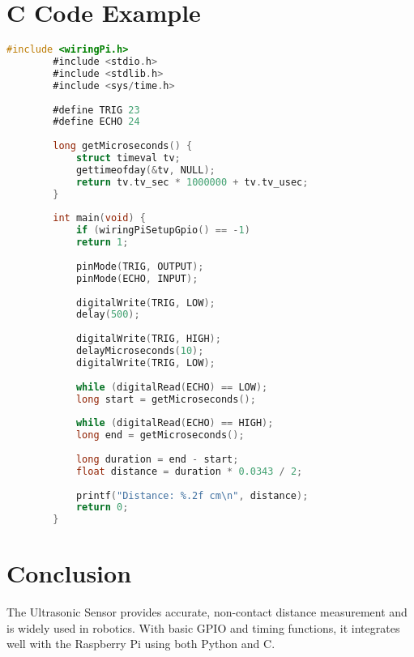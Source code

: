 \documentclass{article}
\begin{document}
	\section{C Code Example}
	\begin{lstlisting}[language=C]
		#include <wiringPi.h>
		#include <stdio.h>
		#include <stdlib.h>
		#include <sys/time.h>
		
		#define TRIG 23
		#define ECHO 24
		
		long getMicroseconds() {
			struct timeval tv;
			gettimeofday(&tv, NULL);
			return tv.tv_sec * 1000000 + tv.tv_usec;
		}
		
		int main(void) {
			if (wiringPiSetupGpio() == -1)
			return 1;
			
			pinMode(TRIG, OUTPUT);
			pinMode(ECHO, INPUT);
			
			digitalWrite(TRIG, LOW);
			delay(500);
			
			digitalWrite(TRIG, HIGH);
			delayMicroseconds(10);
			digitalWrite(TRIG, LOW);
			
			while (digitalRead(ECHO) == LOW);
			long start = getMicroseconds();
			
			while (digitalRead(ECHO) == HIGH);
			long end = getMicroseconds();
			
			long duration = end - start;
			float distance = duration * 0.0343 / 2;
			
			printf("Distance: %.2f cm\n", distance);
			return 0;
		}
	\end{lstlisting}
	
	\section{Conclusion}
	The Ultrasonic Sensor provides accurate, non-contact distance measurement and is widely used in robotics. With basic GPIO and timing functions, it integrates well with the Raspberry Pi using both Python and C.
	
\end{document}
